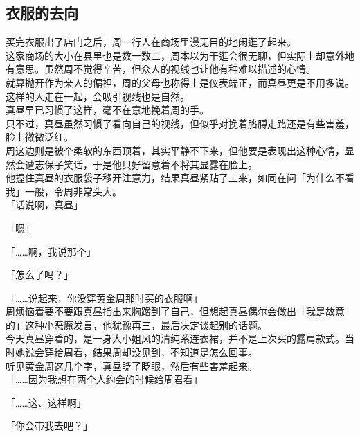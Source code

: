 \subsection{衣服的去向}

买完衣服出了店门之后，周一行人在商场里漫无目的地闲逛了起来。\\

这家商场的大小在县里也是数一数二，周本以为干逛会很无聊，但实际上却意外地有意思。虽然周不觉得辛苦，但众人的视线也让他有种难以描述的心情。\\

就算抛开作为亲人的偏袒，周的父母也称得上是仪表端正，而真昼更是不用多说。这样的人走在一起，会吸引视线也是自然。\\

真昼早已习惯了这样，毫不在意地挽着周的手。\\

只不过，真昼虽然习惯了看向自己的视线，但似乎对挽着胳膊走路还是有些害羞，脸上微微泛红。\\

周这边则是被个柔软的东西顶着，其实平静不下来，但他要是表现出这种心情，显然会遭志保子笑话，于是他只好留意着不将其显露在脸上。\\

他握住真昼的衣服袋子移开注意力，结果真昼紧贴了上来，如同在问「为什么不看我」一般，令周非常头大。\\

「话说啊，真昼」

「嗯」

「……啊，我说那个」

「怎么了吗？」

「……说起来，你没穿黄金周那时买的衣服啊」\\

周烦恼着要不要跟真昼指出来胸蹭到了自己，但想起真昼偶尔会做出「我是故意的」这种小恶魔发言，他犹豫再三，最后决定谈起别的话题。\\

今天真昼穿着的，是一身大小姐风的清纯系连衣裙，并不是上次买的露肩款式。当时她说会穿给周看，结果周却没见到，不知道是怎么回事。\\

听见黄金周这几个字，真昼眨了眨眼，然后有些害羞起来。\\

「……因为我想在两个人约会的时候给周君看」

「……这、这样啊」

「你会带我去吧？」\\

